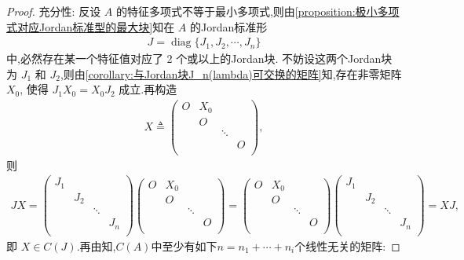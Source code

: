 \documentclass[../../main.tex]{subfiles}%
\begin{document}
\begin{proof}
{\heiti 充分性:} 反设 $A$ 的特征多项式不等于最小多项式,则由\cref{proposition:极小多项式对应Jordan标准型的最大块}知在 $A$ 的Jordan标准形
\begin{align*}
J = \operatorname{diag}\{J_1,J_2, \cdots, J_n\}
\end{align*}
中,必然存在某一个特征值对应了 2 个或以上的Jordan块. 
不妨设这两个Jordan块为 $J_1$ 和 $J_2$,则由\cref{corollary:与Jordan块J_n(lambda)可交换的矩阵}知,存在非零矩阵 $X_0$, 使得 $J_1 X_0 = X_0 J_2$ 成立.再构造
\begin{align*}
X \triangleq \left( \begin{matrix}
O&		X_0&		&		\\
&		O&		&		\\
&		&		\ddots&		\\
&		&		&		O\\
\end{matrix} \right) ,
\end{align*}
则
\begin{align*}
JX=\left( \begin{matrix}
J_1&		&		&		\\
&		J_2&		&		\\
&		&		\ddots&		\\
&		&		&		J_n\\
\end{matrix} \right) \left( \begin{matrix}
O&		X_0&		&		\\
&		O&		&		\\
&		&		\ddots&		\\
&		&		&		O\\
\end{matrix} \right) =\left( \begin{matrix}
O&		X_0&		&		\\
&		O&		&		\\
&		&		\ddots&		\\
&		&		&		O\\
\end{matrix} \right) \left( \begin{matrix}
J_1&		&		&		\\
&		J_2&		&		\\
&		&		\ddots&		\\
&		&		&		J_n\\
\end{matrix} \right) =XJ,
\end{align*}
即 $X \in C(J)$.再由知,$C(A)$中至少有如下$n=n_1+\cdots+n_i$个线性无关的矩阵:

\end{proof}
\end{document}
